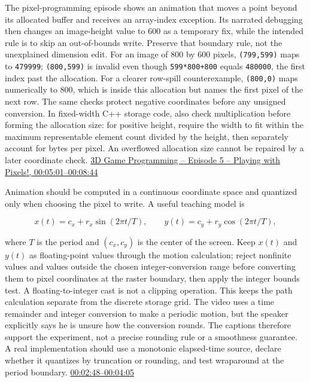 The pixel-programming episode shows an animation that moves a point beyond its allocated buffer and receives an array-index exception. Its narrated debugging then changes an image-height value to 600 as a temporary fix, while the intended rule is to skip an out-of-bounds write. Preserve that boundary rule, not the unexplained dimension edit. For an image of 800 by 600 pixels, \texttt{(799,599)} maps to \texttt{479999}; \texttt{(800,599)} is invalid even though \texttt{599*800+800} equals \texttt{480000}, the first index past the allocation. For a clearer row-spill counterexample, \texttt{(800,0)} maps numerically to 800, which is inside this allocation but names the first pixel of the next row. The same checks protect negative coordinates before any unsigned conversion. In fixed-width C++ storage code, also check multiplication before forming the allocation size: for positive height, require the width to fit within the maximum representable element count divided by the height, then separately account for bytes per pixel. An overflowed allocation size cannot be repaired by a later coordinate check. \href{https://www.youtube.com/watch?v=dwn_UrItwfw&t=301s}{3D Game Programming -- Episode 5 -- Playing with Pixels!, 00:05:01--00:08:44}

Animation should be computed in a continuous coordinate space and quantized only when choosing the pixel to write. A useful teaching model is

\[
x(t)=c_x+r_x\sin(2\pi t/T),\qquad y(t)=c_y+r_y\cos(2\pi t/T),
\]

where \(T\) is the period and \((c_x,c_y)\) is the center of the screen. Keep \(x(t)\) and \(y(t)\) as floating-point values through the motion calculation; reject nonfinite values and values outside the chosen integer-conversion range before converting them to pixel coordinates at the raster boundary, then apply the integer bounds test. A floating-to-integer cast is not a clipping operation. This keeps the path calculation separate from the discrete storage grid. The video uses a time remainder and integer conversion to make a periodic motion, but the speaker explicitly says he is unsure how the conversion rounds. The captions therefore support the experiment, not a precise rounding rule or a smoothness guarantee. A real implementation should use a monotonic elapsed-time source, declare whether it quantizes by truncation or rounding, and test wraparound at the period boundary. \href{https://www.youtube.com/watch?v=dwn_UrItwfw&t=168s}{00:02:48--00:04:05}

